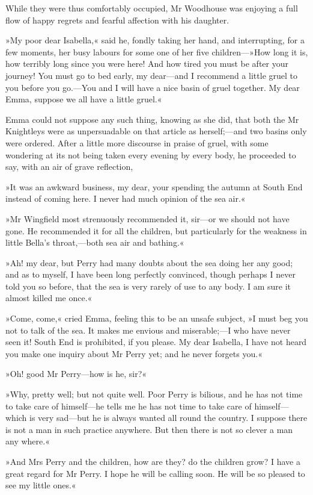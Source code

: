 While they were thus comfortably occupied, Mr Woodhouse was enjoying a full flow of happy regrets and fearful affection with his daughter.

»My poor dear Isabella,« said he, fondly taking her hand, and interrupting, for a few moments, her busy labours for some one of her five children—»How long it is, how terribly long since you were here! And how tired you must be after your journey! You must go to bed early, my dear—and I recommend a little gruel to you before you go.—You and I will have a nice basin of gruel together. My dear Emma, suppose we all have a little gruel.«

Emma could not suppose any such thing, knowing as she did, that both the Mr Knightleys were as unpersuadable on that article as herself;—and two basins only were ordered. After a little more discourse in praise of gruel, with some wondering at its not being taken every evening by every body, he proceeded to say, with an air of grave reflection,

»It was an awkward business, my dear, your spending the autumn at South End instead of coming here. I never had much opinion of the sea air.«

»Mr Wingfield most strenuously recommended it, sir—or we should not have gone. He recommended it for all the children, but particularly for the weakness in little Bella's throat,—both sea air and bathing.«

»Ah! my dear, but Perry had many doubts about the sea doing her any good; and as to myself, I have been long perfectly convinced, though perhaps I never told you so before, that the sea is very rarely of use to any body. I am sure it almost killed me once.«

»Come, come,« cried Emma, feeling this to be an unsafe subject, »I must beg you not to talk of the sea. It makes me envious and miserable;—I who have never seen it! South End is prohibited, if you please. My dear Isabella, I have not heard you make one inquiry about Mr Perry yet; and he never forgets you.«

»Oh! good Mr Perry—how is he, sir?«

»Why, pretty well; but not quite well. Poor Perry is bilious, and he has not time to take care of himself—he tells me he has not time to take care of himself—which is very sad—but he is always wanted all round the country. I suppose there is not a man in such practice anywhere. But then there is not so clever a man any where.«

»And Mrs Perry and the children, how are they? do the children grow? I have a great regard for Mr Perry. I hope he will be calling soon. He will be so pleased to see my little ones.«

